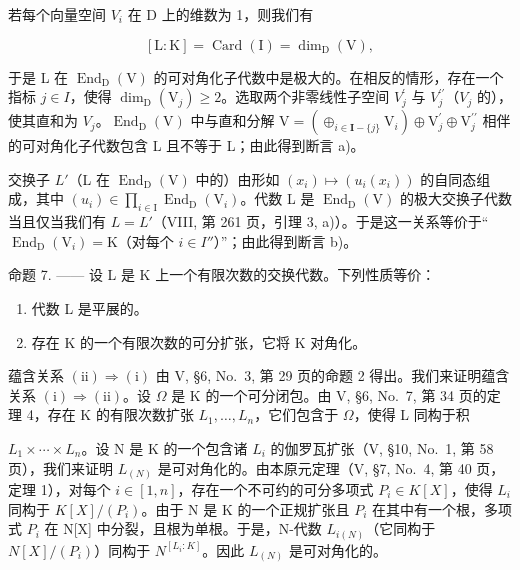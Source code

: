 若每个向量空间 \(V_{i}\) 在 D 上的维数为 1，则我们有

\[
[ \mathrm{L}: \mathrm{K} ] = \operatorname{Card} (\mathrm{I}) = \dim_ {\mathrm{D}} (\mathrm{V}),
\]

于是 L 在 \(\operatorname{End}_{\mathrm{D}}(\mathrm{V})\) 的可对角化子代数中是极大的。在相反的情形，存在一个指标 \(j \in I\)，使得 \(\dim_{\mathrm{D}}(\mathrm{V}_{j}) \geqslant 2\)。选取两个非零线性子空间 \(V_{j}^{\prime}\) 与 \(V_{j}^{\prime\prime}\)（\(V_{j}\) 的），使其直和为 \(V_{j}\)。\(\operatorname{End}_{\mathrm{D}}(\mathrm{V})\) 中与直和分解 \(\mathrm{V} = (\oplus_{i \in \mathbf{I} - \{j\}} \mathrm{V}_{i}) \oplus \mathrm{V}_{j}^{\prime} \oplus \mathrm{V}_{j}^{\prime\prime}\) 相伴的可对角化子代数包含 L 且不等于 L；由此得到断言 a)。

交换子 \(L'\)（L 在 \(\operatorname{End}_{\mathrm{D}}(\mathrm{V})\) 中的）由形如 \((x_{i}) \mapsto (u_{i}(x_{i}))\) 的自同态组成，其中 \((u_{i}) \in \prod_{i \in \mathrm{I}} \operatorname{End}_{\mathrm{D}}(\mathrm{V}_{i})\)。代数 L 是 \(\operatorname{End}_{\mathrm{D}}(\mathrm{V})\) 的极大交换子代数当且仅当我们有 \(L = L'\)（VIII, 第 261 页，引理 3, a)）。于是这一关系等价于“\(\operatorname{End}_{\mathrm{D}}(\mathrm{V}_{i}) = \mathrm{K}\)（对每个 \(i \in I''\)）”；由此得到断言 b)。

命题 7. —— 设 L 是 K 上一个有限次数的交换代数。下列性质等价：

\begin{enumerate}
\def\labelenumi{(\roman{enumi})}
\item
  代数 L 是平展的。
\item
  存在 K 的一个有限次数的可分扩张，它将 K 对角化。
\end{enumerate}

蕴含关系 \((\mathrm{ii})\Rightarrow(\mathrm{i})\) 由 V, §6, No.~3, 第 29 页的命题 2 得出。我们来证明蕴含关系 \((\mathrm{i})\Rightarrow(\mathrm{ii})\)。设 \(\Omega\) 是 K 的一个可分闭包。由 V, §6, No.~7, 第 34 页的定理 4，存在 K 的有限次数扩张 \(L_{1},\ldots,L_{n}\)，它们包含于 \(\Omega\)，使得 L 同构于积

\(L_{1} \times \cdots \times L_{n}\)。设 N 是 K 的一个包含诸 \(L_{i}\) 的伽罗瓦扩张（V, §10, No.~1, 第 58 页），我们来证明 \(L_{(N)}\) 是可对角化的。由本原元定理（V, §7, No.~4, 第 40 页，定理 1），对每个 \(i \in [1, n]\)，存在一个不可约的可分多项式 \(P_{i} \in K[X]\)，使得 \(L_{i}\) 同构于 \(K[X]/(P_{i})\)。由于 N 是 K 的一个正规扩张且 \(P_{i}\) 在其中有一个根，多项式 \(P_{i}\) 在 N{[}X{]} 中分裂，且根为单根。于是，N-代数 \(L_{i(N)}\)（它同构于 \(N[X]/(P_{i})\)）同构于 \(N^{[L_{i}:K]}\)。因此 \(L_{(N)}\) 是可对角化的。

